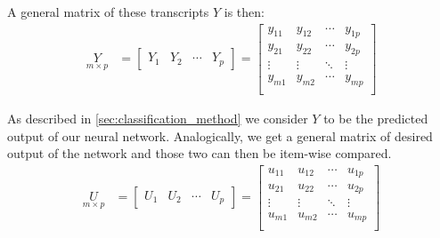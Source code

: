 A general matrix of these transcripts $ Y $ is then:
\begin{align*}
\underset{m\times p}{Y} &= 
\begin{bmatrix}
    Y_1 & Y_2 & \cdots & Y_p
\end{bmatrix} =
\begin{bmatrix}
    y_{11} & y_{12} & \cdots & y_{1p} \\
    y_{21} & y_{22} & \cdots & y_{2p} \\
    \vdots & \vdots & \ddots & \vdots \\
    y_{m1} & y_{m2} & \cdots & y_{mp} \\      
\end{bmatrix}
\end{align*}

As described in \cref{sec:classification_method} we consider $ Y $ to be the predicted output of our neural network. Analogically, we get a general matrix of desired output of the network and those two can then be item-wise compared.
\begin{align*}
\underset{m\times p}{U} &= 
\begin{bmatrix}
    U_1 & U_2 & \cdots & U_p
\end{bmatrix} =
\begin{bmatrix}
    u_{11} & u_{12} & \cdots & u_{1p} \\
    u_{21} & u_{22} & \cdots & u_{2p} \\
    \vdots & \vdots & \ddots & \vdots \\
    u_{m1} & u_{m2} & \cdots & u_{mp} \\      
\end{bmatrix}
\end{align*}

